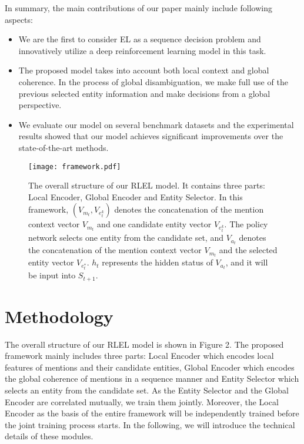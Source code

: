 \documentclass[sigconf]{acmart}
\begin{document}
In summary, the main contributions of our paper mainly include following aspects:
\begin{itemize}

\item We are the first to consider EL as a sequence decision problem and innovatively utilize a deep reinforcement learning model in this task.

\item The proposed model takes into account both local context and global coherence. In the process of global disambiguation, we make full use of the previous selected entity information and make decisions from a global perspective.

\item We evaluate our model on several benchmark datasets and the experimental results showed that our model achieves significant improvements over the state-of-the-art methods.
\end{itemize}

\begin{figure*}[t]
\centering
\texttt{[image: framework.pdf]}
\caption{The overall structure of our RLEL model. It contains three parts: Local Encoder, Global Encoder and Entity Selector. In this framework, $(V_{m_t}, V_{e_t^k})$ denotes the concatenation of the mention context vector $V_{m_t}$ and one candidate entity vector $V_{e_t^k}$. The policy network selects one entity from the candidate set, and $V_{a_t}$ denotes the concatenation of the mention context vector $V_{m_t}$ and the selected entity vector $V_{e_t^*}$. $h_t$ represents the hidden status of $V_{a_t}$, and it will be input into $S_{t+1}$.}

\end{figure*}

\section{Methodology}
The overall structure of our RLEL model is shown in Figure 2. The proposed framework mainly includes three parts: Local Encoder which encodes local features of mentions and their candidate entities, Global Encoder which encodes the global coherence of mentions in a sequence manner and Entity Selector which selects an entity from the candidate set. As the Entity Selector and the Global Encoder are correlated mutually, we train them jointly. Moreover, the Local Encoder as the basis of the entire framework will be independently trained before the joint training process starts. In the following, we will introduce the technical details of these modules.
\end{document}
